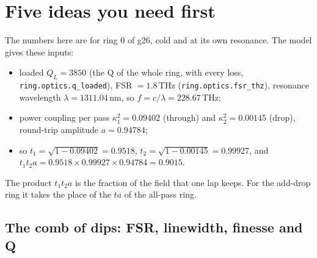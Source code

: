 \documentclass[11pt,letterpaper]{article}
\begin{document}

\section{Five ideas you need first}\label{sec:five}

The numbers here are for ring 0 of g26, cold and at its own resonance. The model gives these inputs:
\begin{itemize}
  \item loaded $Q_L=3850$ (the Q of the whole ring, with every loss, \texttt{ring.optics.q\_loaded}), FSR $=1.8$\,THz (\texttt{ring.optics.fsr\_thz}),
  resonance wavelength $\lambda=1311.04$\,nm, so $f=c/\lambda=228.67$\,THz;
  \item power coupling per pass $\kappa_1^2=0.09402$ (through) and $\kappa_2^2=0.00145$ (drop), round-trip amplitude
  $a=0.94784$;
  \item so $t_1=\sqrt{1-0.09402}=0.9518$, $t_2=\sqrt{1-0.00145}=0.99927$, and $t_1t_2a=0.9518\times0.99927\times0.94784=0.9015$.
\end{itemize}
The product $t_1t_2a$ is the fraction of the field that one lap keeps. For the add-drop ring it takes the place of
the $ta$ of the all-pass ring.

\subsection{The comb of dips: FSR, linewidth, finesse and Q}\label{sec:comb}
\end{document}
